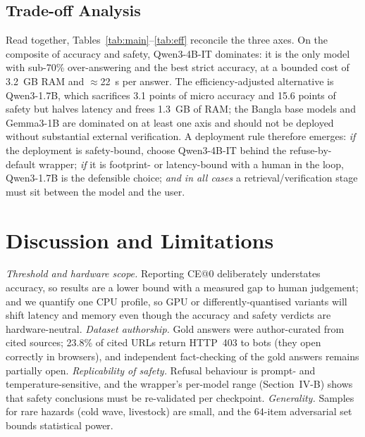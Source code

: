 \documentclass[conference]{IEEEtran}
\begin{document}
\subsection{Trade-off Analysis}
Read together, Tables~\ref{tab:main}--\ref{tab:eff} reconcile the three axes. On the composite of accuracy and
safety, Qwen3-4B-IT dominates: it is the only model with sub-70\% over-answering and the best strict accuracy,
at a bounded cost of 3.2~GB RAM and $\approx$22~s per answer. The efficiency-adjusted alternative is Qwen3-1.7B,
which sacrifices 3.1 points of micro accuracy and 15.6 points of safety but halves latency and frees 1.3~GB of
RAM; the Bangla base models and Gemma3-1B are dominated on at least one axis and should not be deployed without
substantial external verification. A deployment rule therefore emerges: \emph{if} the deployment is
safety-bound, choose Qwen3-4B-IT behind the refuse-by-default wrapper; \emph{if} it is footprint- or
latency-bound with a human in the loop, Qwen3-1.7B is the defensible choice; \emph{and in all cases} a
retrieval/verification stage must sit between the model and the user.

\section{Discussion and Limitations}
\emph{Threshold and hardware scope.} Reporting CE@0 deliberately understates accuracy, so results are a lower bound with a measured gap to human judgement; and we quantify one CPU profile, so GPU or differently-quantised variants will shift latency and memory even though the accuracy and safety verdicts are hardware-neutral. \emph{Dataset authorship.} Gold answers were author-curated from cited sources; 23.8\% of cited URLs return HTTP~403 to bots (they open correctly in browsers), and independent fact-checking of the gold answers remains partially open. \emph{Replicability of safety.} Refusal behaviour is prompt- and temperature-sensitive, and the wrapper's per-model range (Section~IV-B) shows that safety conclusions must be re-validated per checkpoint. \emph{Generality.} Samples for rare hazards (cold wave, livestock) are small, and the 64-item adversarial set bounds statistical power.
\end{document}
